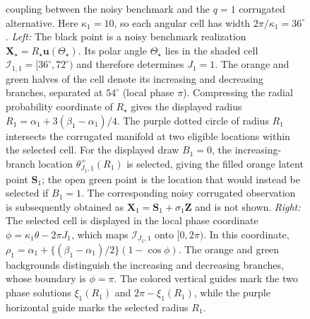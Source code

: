 \begin{figure}[ht]
{coupling between the noisy benchmark and the $q=1$ corrugated
alternative. Here $\kappa_1=10$, so
each angular cell has width $2\pi/\kappa_1=36^\circ$.
\textit{Left:} The black point is a noisy benchmark realization
$\boldsymbol X_\star=R_\star\boldsymbol u(\Theta_\star)$. Its polar angle
$\Theta_\star$ lies in the shaded cell
$\mathcal I_{1,1}=[36^\circ,72^\circ)$ and therefore determines
$J_1=1$. The orange and green halves of the cell denote its increasing
and decreasing branches, separated at $54^\circ$ (local phase $\pi$).
Compressing the radial probability coordinate of $R_\star$
gives the displayed radius
$R_1=\alpha_1+3(\beta_1-\alpha_1)/4$. The purple dotted circle of radius
$R_1$ intersects the
corrugated manifold at two eligible locations within the selected cell.
For the displayed draw $B_1=0$, the increasing-branch location
$\theta_{J_1,1}^{+}(R_1)$ is selected, giving the filled orange
latent point $\boldsymbol S_1$; the open green point is the location that
would instead be selected if $B_1=1$. The corresponding noisy
corrugated observation is subsequently obtained as
$\boldsymbol X_1=\boldsymbol S_1+\sigma_1\boldsymbol Z$ and is not shown.
\textit{Right:} The selected cell is displayed in the local phase
coordinate $\phi=\kappa_1\theta-2\pi J_1$, which maps
$\mathcal I_{J_1,1}$ onto $[0,2\pi)$. In this coordinate,
$\rho_1=\alpha_1+\{(\beta_1-\alpha_1)/2\}(1-\cos\phi)$. The orange and
green backgrounds distinguish the increasing and decreasing branches,
whose boundary is $\phi=\pi$. The colored vertical guides mark the two
phase solutions $\xi_1(R_1)$ and $2\pi-\xi_1(R_1)$, while the purple
horizontal guide marks the selected radius $R_1$.}
\label{fig:corrugation-angular-cells}
\end{figure}
